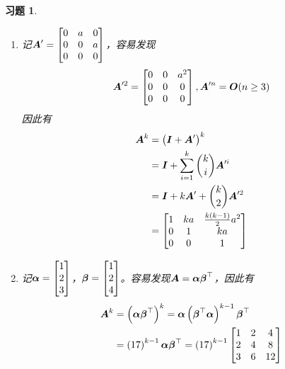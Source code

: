 \documentclass{ctexart}
\newtheorem{problem}{习题}[section]
\begin{document}
\setcounter{problem}{21}
\begin{problem}\

\begin{enumerate}
    \item 记\(\boldsymbol{A}'=\begin{bmatrix}0&a&0\\0&0&a\\0&0&0\end{bmatrix}\)，容易发现
          \begin{equation*}
              \boldsymbol{A}'^2=\begin{bmatrix}0&0&a^2\\0&0&0\\0&0&0\end{bmatrix},\boldsymbol{A}'^n=\boldsymbol{O}(n\ge3)
          \end{equation*}
          因此有
          \begin{align*}
              \boldsymbol{A}^k & =\left( \boldsymbol{I}+\boldsymbol{A}' \right)^k                 \\
                      & =\boldsymbol{I}+\sum_{i=1}^k\binom{k}{i}\boldsymbol{A}'^i \\
                      & =\boldsymbol{I}+k\boldsymbol{A}'+\binom{k}{2}\boldsymbol{A}'^2     \\
                      & =\begin{bmatrix}
                  1 & ka & \frac{k(k-1)}{2}a^2 \\
                  0 & 1  & ka                  \\
                  0 & 0  & 1
              \end{bmatrix}
          \end{align*}
    \item 记\(\boldsymbol{\alpha}=\begin{bmatrix}1\\2\\3\end{bmatrix}\)，\(\boldsymbol{\beta}=\begin{bmatrix}1\\2\\4\end{bmatrix}\)。容易发现\(\boldsymbol{A}=\boldsymbol{\alpha}\boldsymbol{\beta}^\top\)，因此有
          \begin{align*}
              \boldsymbol{A}^k & =\left( \boldsymbol{\alpha}\boldsymbol{\beta}^\top \right)^k=\boldsymbol{\alpha}\left( \boldsymbol{\beta}^\top\boldsymbol{\alpha} \right)^{k-1}\boldsymbol{\beta}^\top \\
                      & =\left( 17 \right)^{k-1}\boldsymbol{\alpha}\boldsymbol{\beta}^\top=\left( 17 \right)^{k-1}
              \begin{bmatrix}
                  1 & 2 & 4 \\2&4&8\\3&6&12
              \end{bmatrix}
          \end{align*}
\end{enumerate}

\end{problem}
\end{document}
